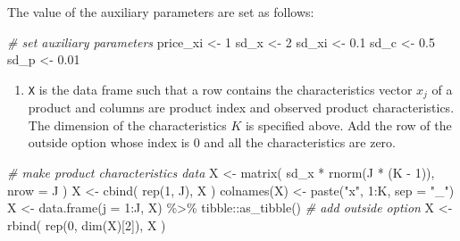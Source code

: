 \documentclass[
]{book}
\newenvironment{Shaded}{\begin{snugshade}}{\end{snugshade}}
\newcommand{\AttributeTok}[1]{\textcolor[rgb]{0.77,0.63,0.00}{#1}}
\newcommand{\CommentTok}[1]{\textcolor[rgb]{0.56,0.35,0.01}{\textit{#1}}}
\newcommand{\DecValTok}[1]{\textcolor[rgb]{0.00,0.00,0.81}{#1}}
\newcommand{\FloatTok}[1]{\textcolor[rgb]{0.00,0.00,0.81}{#1}}
\newcommand{\FunctionTok}[1]{\textcolor[rgb]{0.00,0.00,0.00}{#1}}
\newcommand{\NormalTok}[1]{#1}
\newcommand{\OtherTok}[1]{\textcolor[rgb]{0.56,0.35,0.01}{#1}}
\newcommand{\SpecialCharTok}[1]{\textcolor[rgb]{0.00,0.00,0.00}{#1}}
\newcommand{\StringTok}[1]{\textcolor[rgb]{0.31,0.60,0.02}{#1}}
\providecommand{\tightlist}{%
  \setlength{\itemsep}{0pt}\setlength{\parskip}{0pt}}
\begin{document}
The value of the auxiliary parameters are set as follows:

\begin{Shaded}
\begin{Highlighting}[]
\CommentTok{\# set auxiliary parameters}
\NormalTok{price\_xi }\OtherTok{\textless{}{-}} \DecValTok{1}
\NormalTok{sd\_x }\OtherTok{\textless{}{-}} \DecValTok{2}
\NormalTok{sd\_xi }\OtherTok{\textless{}{-}} \FloatTok{0.1}
\NormalTok{sd\_c }\OtherTok{\textless{}{-}} \FloatTok{0.5}
\NormalTok{sd\_p }\OtherTok{\textless{}{-}} \FloatTok{0.01}
\end{Highlighting}
\end{Shaded}

\begin{enumerate}
\def\labelenumi{\arabic{enumi}.}
\setcounter{enumi}{1}
\tightlist
\item
  \texttt{X} is the data frame such that a row contains the characteristics vector \(x_{j}\) of a product and columns are product index and observed product characteristics. The dimension of the characteristics \(K\) is specified above. Add the row of the outside option whose index is \(0\) and all the characteristics are zero.
\end{enumerate}

\begin{Shaded}
\begin{Highlighting}[]
\CommentTok{\# make product characteristics data}
\NormalTok{X }\OtherTok{\textless{}{-}} 
  \FunctionTok{matrix}\NormalTok{(}
\NormalTok{    sd\_x }\SpecialCharTok{*} \FunctionTok{rnorm}\NormalTok{(J }\SpecialCharTok{*}\NormalTok{ (K }\SpecialCharTok{{-}} \DecValTok{1}\NormalTok{)), }
    \AttributeTok{nrow =}\NormalTok{ J}
\NormalTok{    )}
\NormalTok{X }\OtherTok{\textless{}{-}} 
  \FunctionTok{cbind}\NormalTok{(}
    \FunctionTok{rep}\NormalTok{(}\DecValTok{1}\NormalTok{, J), }
\NormalTok{    X}
\NormalTok{    )}
\FunctionTok{colnames}\NormalTok{(X) }\OtherTok{\textless{}{-}} \FunctionTok{paste}\NormalTok{(}\StringTok{"x"}\NormalTok{, }\DecValTok{1}\SpecialCharTok{:}\NormalTok{K, }\AttributeTok{sep =} \StringTok{"\_"}\NormalTok{)}
\NormalTok{X }\OtherTok{\textless{}{-}} 
  \FunctionTok{data.frame}\NormalTok{(}\AttributeTok{j =} \DecValTok{1}\SpecialCharTok{:}\NormalTok{J, X) }\SpecialCharTok{\%\textgreater{}\%}
\NormalTok{  tibble}\SpecialCharTok{::}\FunctionTok{as\_tibble}\NormalTok{()}
\CommentTok{\# add outside option}
\NormalTok{X }\OtherTok{\textless{}{-}} 
  \FunctionTok{rbind}\NormalTok{(}
    \FunctionTok{rep}\NormalTok{(}\DecValTok{0}\NormalTok{, }\FunctionTok{dim}\NormalTok{(X)[}\DecValTok{2}\NormalTok{]),}
\NormalTok{    X}
\NormalTok{    ) }
\end{Highlighting}
\end{Shaded}
\end{document}

